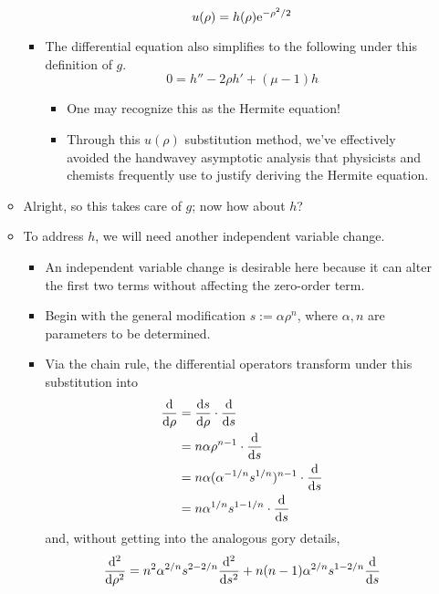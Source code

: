 \documentclass[../finalProject.tex]{subfiles}
\begin{document}
\begin{itemize}
\begin{itemize}
\begin{itemize}
            \begin{equation*}
                u(\rho) = h(\rho)\e[-\rho^2/2]
            \end{equation*}
            \item The differential equation also simplifies to the following under this definition of $g$.
            \begin{equation*}
                0 = h''-2\rho h'+(\mu-1)h
            \end{equation*}
            \begin{itemize}
                \item One may recognize this as the Hermite equation!
                \item Through this $u(\rho)$ substitution method, we've effectively avoided the handwavey asymptotic analysis that physicists and chemists frequently use to justify deriving the Hermite equation.
            \end{itemize}
        \end{itemize}
        \item Alright, so this takes care of $g$; now how about $h$?
        \item To address $h$, we will need another independent variable change.
        \begin{itemize}
            \item An independent variable change is desirable here because it can alter the first two terms without affecting the zero-order term.
            \item Begin with the general modification $s:=\alpha\rho^n$, where $\alpha,n$ are parameters to be determined.
            \item Via the chain rule, the differential operators transform under this substitution into
            \begin{align*}
                \dv{\rho} &= \dv{s}{\rho}\cdot\dv{s}\\
                &= n\alpha\rho^{n-1}\cdot\dv{s}\\
                &= n\alpha(\alpha^{-1/n}s^{1/n})^{n-1}\cdot\dv{s}\\
                &= n\alpha^{1/n}s^{1-1/n}\cdot\dv{s}
            \end{align*}
            and, without getting into the analogous gory details,
            \begin{equation*}
                \dv[2]{\rho} = n^2\alpha^{2/n}s^{2-2/n}\dv[2]{s}+n(n-1)\alpha^{2/n}s^{1-2/n}\dv{s}

\end{equation*}
\end{itemize}
\end{itemize}
\end{itemize}
\end{document}
